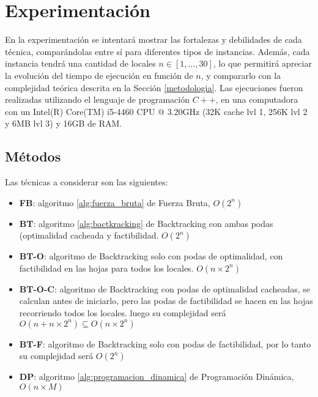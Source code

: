 \section{Experimentación}

En la experimentación se intentará mostrar las fortalezas y debilidades de cada técnica, comparándolas entre sí para diferentes tipos de instancias. Además, cada instancia tendrá una cantidad de locales $n \in [1,\dots,30]$, lo que permitirá apreciar la evolución del tiempo de ejecución en función de $n$, y compararlo con la complejidad teórica descrita en la Sección \ref{metodologia}. Las ejecuciones fueron realizadas utilizando el lenguaje de programación $C++$, en una computadora con un Intel(R) Core(TM) i5-4460 CPU @ 3.20GHz (32K cache lvl 1, 256K lvl 2 y 6MB lvl 3) y 16GB de RAM.

\subsection{Métodos}

Las técnicas a considerar son las siguientes:

\begin{itemize}
    \itemsep 0em 
    \item \textbf{FB}: algoritmo \ref{alg:fuerza_bruta} de Fuerza Bruta, $O(2^n)$
    \item \textbf{BT}: algoritmo \ref{alg:bactkracking} de Backtracking con ambas podas (optimalidad cacheada y factibilidad. $O(2^n)$
    \item \textbf{BT-O}: algoritmo de Backtracking solo con podas de optimalidad, con factibilidad en las hojas para todos los locales. $O(n\times2^n)$
    \item \textbf{BT-O-C}: algoritmo de Backtracking con podas de optimalidad cacheadas, se calculan antes de iniciarlo, pero las podas de factibilidad se hacen en las hojas recorriendo todos los locales. luego su complejidad será $O(n + n\times2^n) \subseteq O(n\times2^n)$
    \item \textbf{BT-F}: algoritmo de Backtracking solo con podas de factibilidad, por lo tanto su complejidad será $O(2^n)$
    \item \textbf{DP}: algoritmo \ref{alg:programacion_dinamica} de Programación Dinámica, $O(n\times M)$
\end{itemize}


